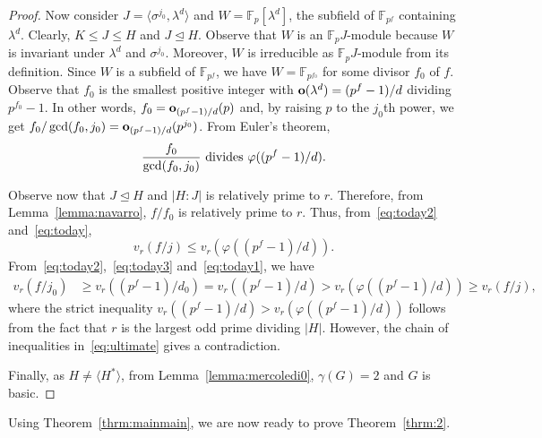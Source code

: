 \documentclass{amsart}
\begin{document}
\begin{proof}
Now consider  $J=\langle \sigma^{j_0},\lambda^d\rangle$ and  $W=\mathbb{F}_p[\lambda^d]$, the subfield of $\mathbb{F}_{p^f}$ containing $\lambda^d$. Clearly, $K\le J\le H$ and $J\unlhd H$. Observe that $W$ is an $\mathbb{F}_pJ$-module because $W$ is invariant under $\lambda^d$ and $\sigma^{j_0}$. Moreover, $W$ is irreducible as $\mathbb{F}_pJ$-module from its definition. Since $W$ is a subfield of $\mathbb{F}_{p^f}$, we have  $W=\mathbb{F}_{p^{f_0}}$ for some divisor $f_0$ of $f$. Observe that $f_0$ is the smallest positive integer with ${\bf o}(\lambda^d)=(p^f-1)/d$ dividing $p^{f_0}-1$. In other words, $f_0={\bf o}_{(p^f-1)/d}(p)$ and, by raising $p$ to the $j_0$th power, we get $f_0/\gcd(f_0,j_0)={\bf o}_{(p^f-1)/d}(p^{j_0})$. From Euler's theorem,
\begin{equation}\label{eq:today}\frac{f_0}{\gcd(f_0,j_0)} \hbox{ divides }\varphi((p^f-1)/d).
\end{equation}

Observe now that $J\unlhd H$ and $|H:J|$ is relatively prime to  $r$. Therefore, from Lemma~\ref{lemma:navarro}, $f/f_0$ is relatively prime to $r$. Thus, from~\eqref{eq:today2} and~\eqref{eq:today}, 
\begin{equation}\label{eq:today1}
v_r(f/j)\le v_r(\varphi((p^f-1)/d)).
\end{equation}
From~\eqref{eq:today2},~\eqref{eq:today3} and~\eqref{eq:today1}, we have
\begin{align}\label{eq:ultimate}
v_r(f/j_0)&\ge v_r((p^f-1)/d_0)=v_r((p^f-1)/d)>v_r(\varphi((p^f-1)/d))\ge v_r(f/j),
\end{align}
where the strict inequality 
$v_r((p^f-1)/d)>v_r(\varphi((p^f-1)/d))$
follows from the fact that $r$ is the largest odd prime dividing $|H|$. However, the chain of inequalities in~\eqref{eq:ultimate} gives a contradiction.

Finally, as $H\ne \langle H^\ast\rangle$, from Lemma~\ref{lemma:mercoledi0}, $\gamma(G)=2$ and $G$ is basic.
\end{proof}

Using Theorem~\ref{thrm:mainmain}, we are now ready to prove Theorem~\ref{thrm:2}.
\end{document}
